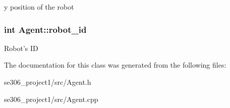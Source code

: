y position of the robot \hypertarget{classAgent_aefcf2085a669d7e91d932e7cc3ee88ce}{
\subsubsection[{robot\-\_\-id}]{\setlength{\rightskip}{0pt plus 5cm}int Agent\-::robot\-\_\-id\hspace{0.3cm}{\ttfamily [protected]}}}\label{classAgent_aefcf2085a669d7e91d932e7cc3ee88ce}
Robot's I\-D 

The documentation for this class was generated from the following files\-:\begin{DoxyCompactItemize}
\item 
se306\-\_\-project1/src/Agent.\-h\item 
se306\-\_\-project1/src/Agent.\-cpp\end{DoxyCompactItemize}
